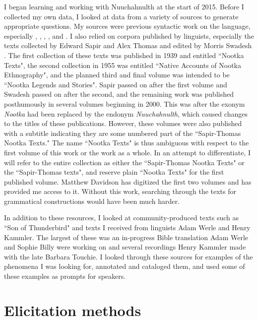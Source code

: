 I began learning and working with Nuuchahnulth at the start of 2015. Before I collected my own data, I looked at data from a variety of sources to generate appropriate questions. My sources were previous syntactic work on the language, especially \citet{jacobsen1993}, \citet{nakayama2001}, \citet{wojdak2003}, \citet{waldie2004}, and \citet{woo2007b}. I also relied on corpora published by linguists, especially the texts collected by Edward Sapir and Alex Thomas and edited by Morris Swadesh \citep{sapir1924, sapir1939, sapir1955, whalingindians2000, whalingindians2004, wolfritual2007, whalingindians2009}. The first collection of these texts was published in 1939 and entitled ``Nootka Texts", the second collection in 1955 was entitled ``Native Accounts of Nootka Ethnography", and the planned third and final volume was intended to be ``Nootka Legends and Stories". Sapir passed on after the first volume and Swadesh passed on after the second, and the remaining work was published posthumously in several volumes beginning in 2000. This was after the exonym \textit{Nootka} had been replaced by the endonym \textit{Nuuchahnulth}, which caused changes to the titles of these publications. However, these volumes were also published with a subtitle indicating they are some numbered part of the ``Sapir-Thomas Nootka Texts." The name ``Nootka Texts" is thus ambiguous with respect to the first volume of this work or the work as a whole. In an attempt to differentiate, I will refer to the entire collection as either the ``Sapir-Thomas Nootka Texts" or the ``Sapir-Thomas texts", and reserve plain ``Nootka Texts" for the first published volume. Matthew Davidson has digitized the first two volumes \citep{sapir1939,sapir1955} and has provided me access to it. Without this work, searching through the texts for grammatical constructions would have been much harder.

In addition to these resources, I looked at community-produced texts such as ``Son of Thunderbird" and texts I received from linguists Adam Werle and Henry Kammler. The largest of these was an in-progress Bible translation Adam Werle and Sophie Billy were working on and several recordings Henry Kammler made with the late Barbara Touchie. I looked through these sources for examples of the phenomena I was looking for, annotated and cataloged them, and used some of these examples as prompts for speakers.

\section{Elicitation methods} \label{ch:method:elicitation}

